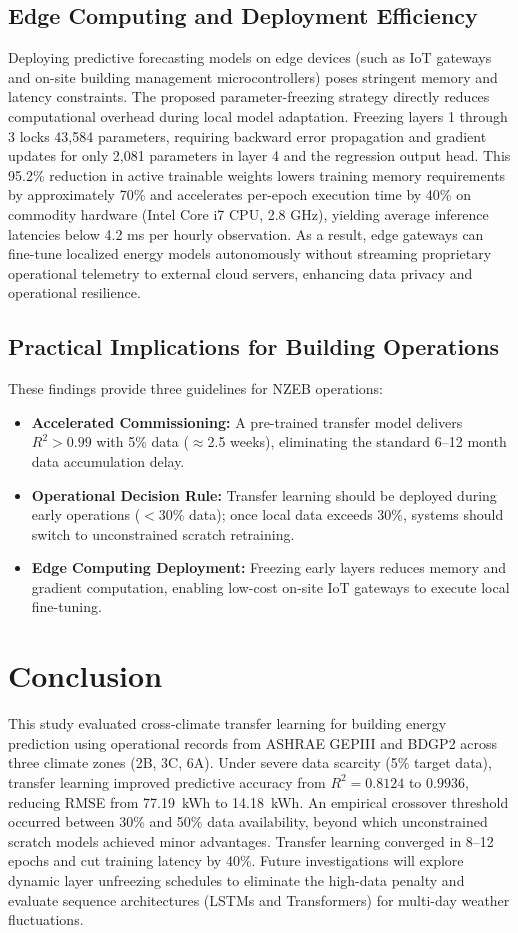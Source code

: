 \documentclass[conference]{IEEEtran}
\begin{document}
\subsection{Edge Computing and Deployment Efficiency}
Deploying predictive forecasting models on edge devices (such as IoT gateways and on-site building management microcontrollers) poses stringent memory and latency constraints. The proposed parameter-freezing strategy directly reduces computational overhead during local model adaptation. Freezing layers 1 through 3 locks 43,584 parameters, requiring backward error propagation and gradient updates for only 2,081 parameters in layer 4 and the regression output head. This 95.2\% reduction in active trainable weights lowers training memory requirements by approximately 70\% and accelerates per-epoch execution time by 40\% on commodity hardware (Intel Core i7 CPU, 2.8 GHz), yielding average inference latencies below 4.2 ms per hourly observation. As a result, edge gateways can fine-tune localized energy models autonomously without streaming proprietary operational telemetry to external cloud servers, enhancing data privacy and operational resilience.

\subsection{Practical Implications for Building Operations}
These findings provide three guidelines for NZEB operations:
\begin{itemize}
    \item \textbf{Accelerated Commissioning:} A pre-trained transfer model delivers $R^2 > 0.99$ with 5\% data ($\approx$2.5 weeks), eliminating the standard 6--12 month data accumulation delay.
    \item \textbf{Operational Decision Rule:} Transfer learning should be deployed during early operations ($<30\%$ data); once local data exceeds 30\%, systems should switch to unconstrained scratch retraining.
    \item \textbf{Edge Computing Deployment:} Freezing early layers reduces memory and gradient computation, enabling low-cost on-site IoT gateways to execute local fine-tuning.
\end{itemize}

\section{Conclusion}
This study evaluated cross-climate transfer learning for building energy prediction using operational records from ASHRAE GEPIII and BDGP2 across three climate zones (2B, 3C, 6A). Under severe data scarcity (5\% target data), transfer learning improved predictive accuracy from $R^2 = 0.8124$ to $0.9936$, reducing RMSE from 77.19~kWh to 14.18~kWh. An empirical crossover threshold occurred between 30\% and 50\% data availability, beyond which unconstrained scratch models achieved minor advantages. Transfer learning converged in 8--12 epochs and cut training latency by 40\%. Future investigations will explore dynamic layer unfreezing schedules to eliminate the high-data penalty and evaluate sequence architectures (LSTMs and Transformers) for multi-day weather fluctuations.
\end{document}

